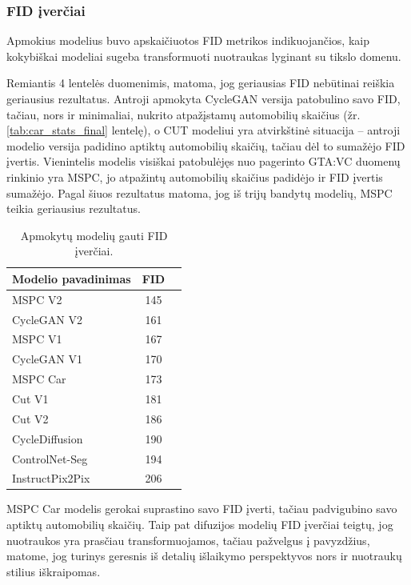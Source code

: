 \documentclass{VUMIFPSbakalaurinis}
\begin{document}
        \subsubsection{FID įverčiai}
            Apmokius modelius buvo apskaičiuotos FID metrikos indikuojančios, kaip kokybiškai modeliai sugeba transformuoti nuotraukas lyginant su tikslo domenu.

            Remiantis 4 lentelės duomenimis, matoma, jog geriausias FID nebūtinai reiškia geriausius rezultatus. Antroji apmokyta CycleGAN versija patobulino savo FID, tačiau, nors ir minimaliai, nukrito atpažįstamų automobilių skaičius (žr. \ref{tab:car_stats_final} lentelę), o CUT modeliui yra atvirkštinė situacija – antroji modelio versija padidino aptiktų automobilių skaičių, tačiau dėl to sumažėjo FID įvertis. Vienintelis modelis visiškai patobulėjęs nuo pagerinto GTA:VC duomenų rinkinio yra MSPC, jo atpažintų automobilių skaičius padidėjo ir FID įvertis sumažėjo. Pagal šiuos rezultatus matoma, jog iš trijų bandytų modelių, MSPC teikia geriausius rezultatus.
            
            \begin{table}[H]
                \footnotesize
                \centering
                \caption{Apmokytų modelių gauti FID įverčiai.}
                {\begin{tabular}{|l|c|c|} \hline
                    Modelio pavadinimas & FID\\
                    \hline
                    MSPC V2 & 145\\
                    CycleGAN V2 & 161\\
                    MSPC V1 & 167\\
                    CycleGAN V1 & 170\\
                    MSPC Car & 173\\ %
                    Cut V1 & 181\\
                    Cut V2 & 186\\ 
                    CycleDiffusion & 190\\ %
                    ControlNet-Seg & 194\\ %
                    InstructPix2Pix & 206\\ %
                    \hline
                    \end{tabular}
                }
                \label{tab:table example}
            \end{table}
    
             MSPC Car modelis gerokai suprastino savo FID įverti, tačiau padvigubino savo aptiktų automobilių skaičių. Taip pat difuzijos modelių FID įverčiai teigtų, jog nuotraukos yra prasčiau transformuojamos, tačiau pažvelgus į pavyzdžius, matome, jog turinys geresnis iš detalių išlaikymo perspektyvos nors ir nuotraukų stilius iškraipomas.
\end{document}

